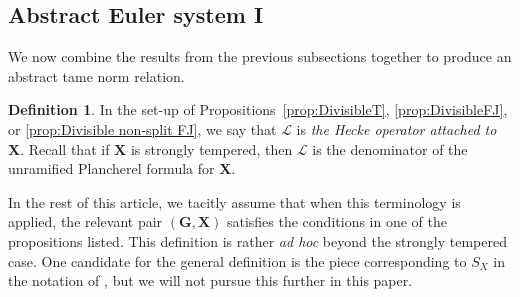 \documentclass{amsart}
\theoremstyle{definition}
\newtheorem{definition}[theorem]{Definition}
\newtheorem{example}[theorem]{Example}
\theoremstyle{remark}
\newcommand{\1}{\mathbf{1}}
\newcommand{\C}{\mathbb{C}}
\newcommand{\mb}[1]{\mathbf{#1}}
\newcommand{\sh}[1]{\mathcal{#1}}
\newcommand{\Z}{\mathbb{Z}}
\theoremstyle{definition}
\newcommand{\shear}{{\mathbin{\mkern-6mu\fatslash}}}
\begin{document}
\subsection{Abstract Euler system I}
We now combine the results from the previous subsections together to produce an abstract tame norm relation.

\begin{definition}\label{def:Hecke}
  In the set-up of Propositions~\ref{prop:DivisibleT}, \ref{prop:DivisibleFJ}, or \ref{prop:Divisible non-split FJ}, we say that $\sh{L}$ is \emph{the Hecke operator attached to} $\mb{X}$. Recall that if $\mb{X}$ is strongly tempered, then $\sh{L}$ is the denominator of the unramified Plancherel formula for $\mb{X}$.
\end{definition}

In the rest of this article, we tacitly assume that when this terminology is applied, the relevant pair $(\mb{G},\mb{X})$ satisfies the conditions in one of the propositions listed. This definition is rather \emph{ad hoc} beyond the strongly tempered case. One candidate for the general definition is the piece corresponding to $S_X$ in the notation of \cite[\S 9.1]{BZSV}, but we will not pursue this further in this paper.

%
%
\end{document}
